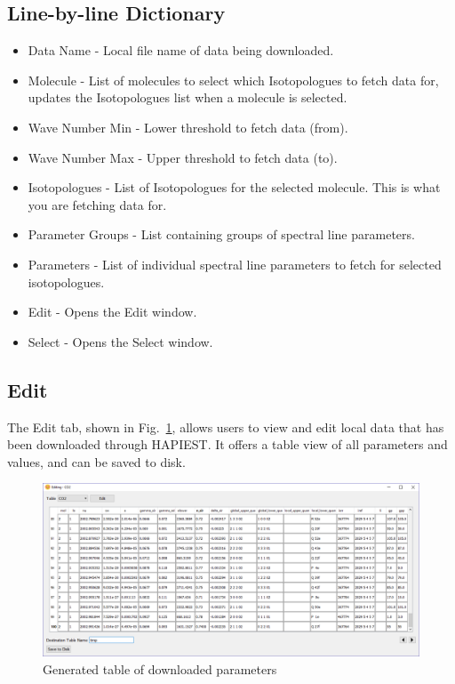 \documentclass[12pt]{article}
\begin{document}
\newpage
\subsection*{Line-by-line Dictionary}
\begin{itemize}
\item Data Name - Local file name of data being downloaded.
\item Molecule - List of molecules to select which Isotopologues to fetch data for, updates the Isotopologues list when a molecule is selected.
\item Wave Number Min - Lower threshold to fetch data (from).
\item Wave Number Max - Upper threshold to fetch data (to).
\item Isotopologues - List of Isotopologues for the selected molecule. This is what you are fetching data for.
\item Parameter Groups - List containing groups of spectral line parameters.
\item Parameters - List of individual spectral line parameters to fetch for selected isotopologues.
\item Edit - Opens the Edit window.
\item Select - Opens the Select window.
\end{itemize}
\newpage

\subsection{Edit}
The Edit tab, shown in Fig.~\ref{fig:edit}, allows users to view and edit local data that has been downloaded through HAPIEST. It offers a table view of all parameters and values, and can be saved to disk.
\begin{figure}[h]
\centering
\includegraphics[scale = 0.5]{hapiest_edit}
\caption{Generated table of downloaded parameters}
\label{fig:edit}
\end{figure}
\end{document}
